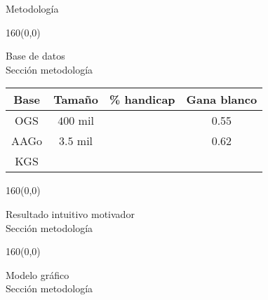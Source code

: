 \documentclass[shownotes,aspectratio=169]{beamer}
\begin{document}
\begin{frame}[plain]
 \centering
 \LARGE Metodolog\'ia
 
\end{frame}


\begin{frame}[plain]
\begin{textblock}{160}(0,0)
\begin{center}
 \Large Base de datos \\ \large Secci\'on metodolog\'ia
\end{center}
\end{textblock}

\begin{table}
\begin{tabular}{|c|c|c|c|} \hline
 Base & Tama\~no & \% handicap & Gana blanco \\ \hline
 OGS & $400$ mil &  & 0.55 \\ \hline
 AAGo & $3.5$ mil &  & 0.62 \\ \hline
 KGS &  & & \\ \hline
\end{tabular}
\end{table}


\end{frame}

\begin{frame}[plain]
\begin{textblock}{160}(0,0)
\begin{center}
 \Large Resultado intuitivo motivador \\ \large Secci\'on metodolog\'ia
\end{center}
\end{textblock}

 
\end{frame}

\begin{frame}[plain]
\begin{textblock}{160}(0,0)
\begin{center}
 \Large Modelo gr\'afico \\ \large Secci\'on metodolog\'ia
\end{center}
\end{textblock}


\end{frame}
\end{document}
